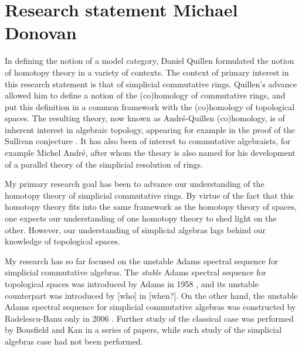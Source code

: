 \documentclass[11pt]{article}
\begin{document}
%
%

\section*{\huge Research statement \hfill\normalsize Michael Donovan} 

In defining the notion of a model category, Daniel Quillen \cite{QuillenHomAlg.pdf} formulated the notion of homotopy theory in a variety of contexts. The context of primary interest in this research statement is that of simplicial commutative rings. Quillen's advance allowed him to define a notion of the (co)homology of commutative rings, and put this definition in a common framework with the (co)homology of topological spaces. The resulting theory, now known as Andr\'e-Quillen (co)homology, is of inherent interest in algebraic topology, appearing for example in the proof of the Sullivan conjecture \cite{MillerSullivanConjecture.pdf}. It has also been of interest to commutative algebraists, for example Michel Andr\'e, after whom the theory is also named for his development of a parallel theory of the simplicial resolution of rings.

My primary research goal has been to advance our understanding of the homotopy theory of simplicial commutative rings. By virtue of the fact that this homotopy theory fits into the same framework as the homotopy theory of spaces, one expects our understanding of one homotopy theory to shed light on the other. However, our understanding of simplicial algebras lags behind our knowledge of topological spaces.

My research has so far focused on the unstable Adams spectral sequence for simplicial commutative algebras. The \emph{stable} Adams spectral sequence for topological spaces  was introduced by Adams in 1958 \cite{MR0096219}, and its unstable counterpart was introduced by [who] in [when?]. On the other hand, the unstable Adams spectral sequence for simplicial commutative algebras was constructed by Radelescu-Banu only in 2006 \cite{radelescuBanu.pdf}. Further study of the classical case was performed by Bousfield and Kan in a series \cite{BousKanSSeq.pdf,BK_pairings.pdf, BK_pairings_products.pdf} of papers, while such study of the simplicial algebras case had not been performed.
\end{document}
